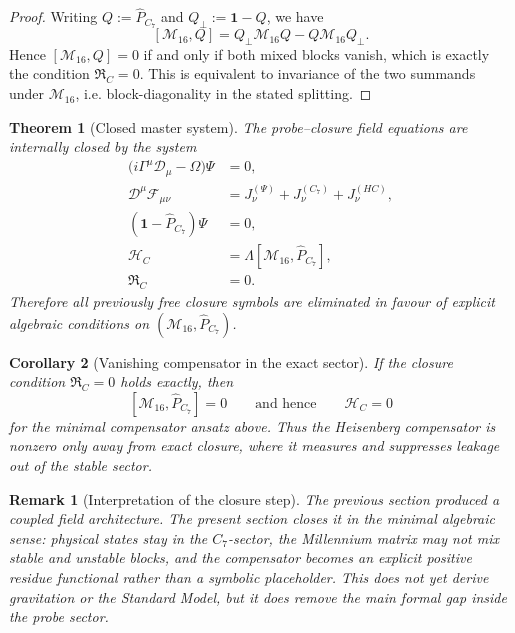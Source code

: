 \documentclass[12pt,a4paper]{article}
\newtheorem{theorem}{Theorem}[section]
\newtheorem{corollary}[theorem]{Corollary}
\newtheorem*{remark}{Remark}
\begin{document}
\begin{proof}
Writing $Q:=\hat P_{C_7}$ and $Q_\perp:=\mathbf 1-Q$, we have
\[
  [\mathcal M_{16},Q]
  =
  Q_\perp\mathcal M_{16}Q - Q\mathcal M_{16}Q_\perp.
\]
Hence $[\mathcal M_{16},Q]=0$ if and only if both mixed blocks vanish,
which is exactly the condition $\mathfrak R_C=0$.
This is equivalent to invariance of the two summands under
$\mathcal M_{16}$, i.e. block-diagonality in the stated splitting.
\end{proof}

\begin{theorem}[Closed master system]
The probe--closure field equations are internally closed by the system
\begin{align*}
  \bigl(i\Gamma^\mu\mathcal D_\mu - \Omega\bigr)\Psi &= 0,\\
  \mathcal D^\mu\mathcal F_{\mu\nu}
    &= J^{(\Psi)}_\nu + J^{(C_7)}_\nu + J^{(HC)}_\nu,\\
  (\mathbf 1-\hat P_{C_7})\Psi &= 0,\\
  \mathcal H_C &= \Lambda[\mathcal M_{16},\hat P_{C_7}],\\
  \mathfrak R_C &= 0.
\end{align*}
Therefore all previously free closure symbols are eliminated in favour
of explicit algebraic conditions on $(\mathcal M_{16},\hat P_{C_7})$.
\end{theorem}

\begin{corollary}[Vanishing compensator in the exact sector]
If the closure condition $\mathfrak R_C=0$ holds exactly, then
\[
  [\mathcal M_{16},\hat P_{C_7}] = 0
  \qquad\text{and hence}\qquad
  \mathcal H_C = 0
\]
for the minimal compensator ansatz above.
Thus the Heisenberg compensator is nonzero only away from exact closure,
where it measures and suppresses leakage out of the stable sector.
\end{corollary}

\begin{remark}[Interpretation of the closure step]
The previous section produced a coupled field architecture.
The present section closes it in the minimal algebraic sense:
physical states stay in the $C_7$-sector, the Millennium matrix may not
mix stable and unstable blocks, and the compensator becomes an explicit
positive residue functional rather than a symbolic placeholder.
This does not yet derive gravitation or the Standard Model, but it does
remove the main formal gap inside the probe sector.
\end{remark}
\end{document}
